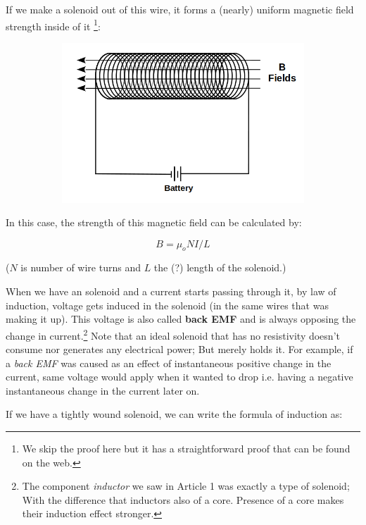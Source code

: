 \documentclass{article}
\begin{document}
	If we make a solenoid out of this wire, it forms a (nearly) uniform magnetic field strength inside of it \footnote[1]{We skip the proof here but it has a straightforward proof that can be found on the web.}:
	
	\begin{figure}[h!]
	\centering
	\begin{subfigure}[b]{0.7\linewidth}
	\includegraphics[width=\linewidth]{solenoid.png}
	\end{subfigure}
	\end{figure}
	
	In this case, the strength of this magnetic field can be calculated by:
	
	$$ B = \mu_o N I / L$$
	
	($N$ is number of wire turns and $L$ the (?) length of the solenoid.)
		
	When we have an solenoid and a current starts passing through it, by law of induction, voltage gets induced in the solenoid (in the same wires that was making it up).
	This voltage is also called \textbf{back EMF} and is always opposing the change in current.\footnote[1]{The component \textit{inductor} we saw in Article 1 was exactly a type of solenoid; With the difference that inductors also of a core. Presence of a core makes their induction effect stronger.}
	Note that an ideal solenoid that has no resistivity doesn't consume nor generates any electrical power; But merely holds it.
	For example, if a \textit{back EMF} was caused as an effect of instantaneous positive change in the current, same voltage would apply when it wanted to drop i.e. having a negative instantaneous change in the current later on.
	
	If we have a tightly wound solenoid, we can write the formula of induction as:
	
\end{document}

